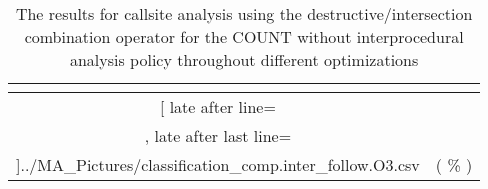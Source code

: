 \begin{table}[!htbp]
{\begin{tabular}{|c|c}
\multicolumn{1}{c}{}
	\\\midrule
	\csvreader[ late after line=\\, late after last line=\\\bottomrule]{../MA_Pictures/classification_comp.inter_follow.O3.csv}{
}
	{\csvcoliv ( \csvcolv \% ) & \csvcolvi( \csvcolvii\% )}%


    	\end{tabular}
}
		\caption {The results for callsite analysis using the destructive/intersection combination operator for the COUNT without interprocedural analysis policy throughout different optimizations}
		\label{tbl:CSdestinterCOUNTnointer}
\end{table}



